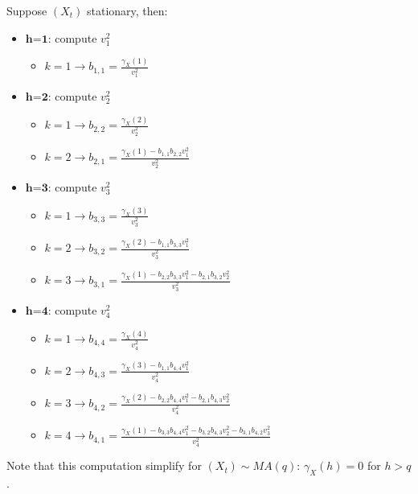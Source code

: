 \begin{example}
    Suppose $(X_t)$ stationary, then:
    \begin{itemize}
        \item $\textbf{h=1}$: compute $v_1^2$
            \begin{itemize}
                \item $k=1\rightarrow b_{1,1}=\frac{\gamma_X(1)}{v_1^2}$
            \end{itemize}
        \item $\textbf{h=2}$: compute $v_2^2$
            \begin{itemize}
                \item $k=1\rightarrow b_{2,2}=\frac{\gamma_X(2)}{v_2^2}$
                \item $k=2\rightarrow b_{2,1}=\frac{\gamma_X(1)-b_{1,1}b_{2,2}v_1^2}{v_2^2}$
            \end{itemize}
        \item $\textbf{h=3}$: compute $v_3^2$
            \begin{itemize}
                \item $k=1\rightarrow b_{3,3}=\frac{\gamma_X(3)}{v_3^2}$
                \item $k=2\rightarrow b_{3,2}=\frac{\gamma_X(2)-b_{1,1}b_{3,3}v_1^2}{v_3^2}$
                \item $k=3\rightarrow b_{3,1}=\frac{\gamma_X(1)-b_{2,2}b_{3,3}v_1^2-b_{2,1}b_{3,2}v_2^2}{v_3^2}$
            \end{itemize}
        \item $\textbf{h=4}$: compute $v_4^2$
            \begin{itemize}
                \item $k=1\rightarrow b_{4,4}=\frac{\gamma_X(4)}{v_4^2}$
                \item $k=2\rightarrow b_{4,3}=\frac{\gamma_X(3)-b_{1,1}b_{4,4}v_1^2}{v_4^2}$
                \item $k=3\rightarrow b_{4,2}=\frac{\gamma_X(2)-b_{2,2}b_{4,4}v_1^2-b_{2,1}b_{4,3}v_2^2}{v_4^2}$
                \item $k=4\rightarrow b_{4,1}=\frac{\gamma_X(1)-b_{3,3}b_{4,4}v_1^2-b_{3,2}b_{4,3}v_2^2-b_{3,1}b_{4,2}v_3^2}{v_4^2}$
            \end{itemize}
    \end{itemize}
    Note that this computation simplify for $(X_t)\sim MA(q)$: $\gamma_X(h)=0$ for $h>q$.
\end{example}

